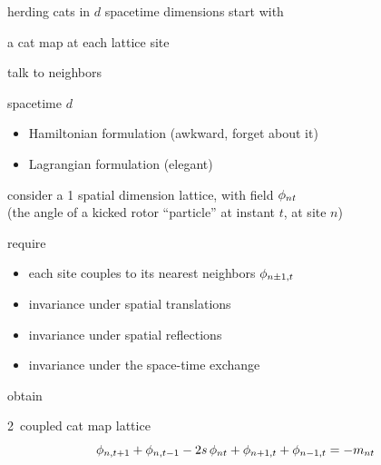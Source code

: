 \begin{frame}{herding cats in $d$ spacetime dimensions}
start with
\begin{block}{a cat map at each lattice site}
\bigskip

talk to neighbors
\medskip

spacetime $d$\dmn\
~~~~~~~ {\color{blue}\Large \catlatt}
\end{block}

\vfill

\begin{itemize}
  \item Hamiltonian formulation \hfill{\footnotesize (awkward, forget about it)}
  \item Lagrangian formulation \hfill{\footnotesize (elegant)}
\end{itemize}
\end{frame}

\begin{frame}{\catlatt}
consider
a 1 spatial dimension lattice, with field
$\phi_{nt}$ \\
(the angle of a kicked
rotor ``particle'' at instant $t$, at site $n$)
\begin{block}{require}
\begin{itemize}
\item  each site couples to
its nearest neighbors $\phi_{n\pm1,t}$
\item  invariance under
spatial translations
\item  invariance under spatial reflections
\item  invariance under the space-time exchange
\end{itemize}
\end{block}

\bigskip

obtain
\begin{block}{2\dmn\ coupled cat map lattice}
\[
\phi_{n,t+1} + \phi_{n,t-1} - 2s \, \phi_{n t} + \phi_{n+1,t} + \phi_{n-1, t}
     =-{m_{n t}}
\] %
\end{block}
\end{frame}

